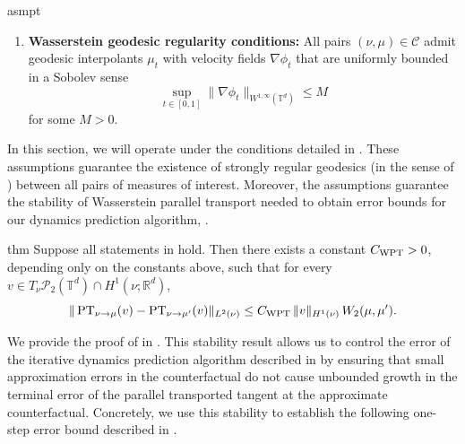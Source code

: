 \documentclass[11pt]{article}
\newcommand{\man}{M}
\newcommand{\PT}{\operatorname{PT}}
\begin{document}
\begin{restatable}[Uniform admissibility of the trajectory class, $\man = \mathbb{T}^d$]{asmpt}{}
\begin{enumerate}[label=\textbf{(A.\arabic*)}, leftmargin=*, align=left]
\item \textbf{Wasserstein geodesic regularity conditions:} 
All pairs $(\nu, \mu) \in \mathcal{C}$ admit geodesic interpolants $\mu_t$ with velocity fields $\nabla \phi_t$ that are uniformly bounded in a Sobolev sense
\[ \sup_{t\in[0, 1]}\|\nabla \phi_t\|_{W^{1, \infty}(\mathbb{T}^d)} \leq M\]
for some $M > 0.$ \label{geodesic regularity conditions}
\end{enumerate}
\end{restatable}

In this section, we will operate under the conditions detailed in . These assumptions guarantee the existence of strongly regular geodesics (in the sense of ) between all pairs of measures of interest. Moreover, the assumptions guarantee the stability of Wasserstein parallel transport needed to obtain error bounds for our dynamics prediction algorithm, .

\begin{restatable}{thm}{} \label{wpt stability statement}
    Suppose all statements in  hold. Then there exists a constant $C_{\rm WPT}>0$, depending only on the constants above, such that for every $v\in T_\nu\mathcal P_2(\mathbb{T}^d)\cap H^1(\nu;\mathbb{R}^d)$,
    \[
    \|\PT_{\nu\to\mu}(v)-\PT_{\nu\to\mu'}(v)\|_{L^2(\nu)}
    \le
    C_{\rm WPT}\,\|v\|_{H^1(\nu)}\,W_2(\mu,\mu').
    \]
\end{restatable}
We provide the proof of  in . This stability result allows us to control the error of the iterative dynamics prediction algorithm described in  by ensuring that small approximation errors in the counterfactual do not cause unbounded growth in the terminal error of the parallel transported tangent at the approximate counterfactual. Concretely, we use this stability to establish the following one-step error bound described in .
\end{document}
